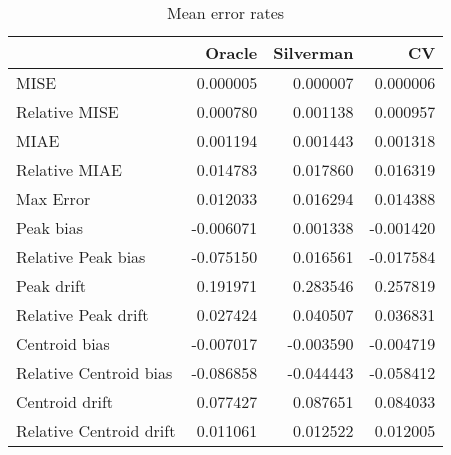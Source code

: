 \begin{table}[H]
\centering
\begin{tabular}{lrrr}
  \hline
 & Oracle & Silverman & CV \\ 
  \hline
MISE & 0.000005 & 0.000007 & 0.000006 \\ 
  Relative MISE & 0.000780 & 0.001138 & 0.000957 \\ 
  MIAE & 0.001194 & 0.001443 & 0.001318 \\ 
  Relative MIAE & 0.014783 & 0.017860 & 0.016319 \\ 
  Max Error & 0.012033 & 0.016294 & 0.014388 \\ 
  Peak bias & -0.006071 & 0.001338 & -0.001420 \\ 
  Relative Peak bias & -0.075150 & 0.016561 & -0.017584 \\ 
  Peak drift & 0.191971 & 0.283546 & 0.257819 \\ 
  Relative Peak drift & 0.027424 & 0.040507 & 0.036831 \\ 
  Centroid bias & -0.007017 & -0.003590 & -0.004719 \\ 
  Relative Centroid bias & -0.086858 & -0.044443 & -0.058412 \\ 
  Centroid drift & 0.077427 & 0.087651 & 0.084033 \\ 
  Relative Centroid drift & 0.011061 & 0.012522 & 0.012005 \\ 
   \hline
\end{tabular}
\caption{Mean error rates} 
\label{tbl:mean_error_rates}
\end{table}
